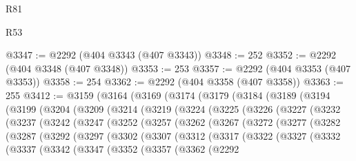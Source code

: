 \begin{lexlean}{R81}
\begin{lexlean}{R53}
\begin{coremodule}
{{{{{{{{{{{{{{{{{{{{{{{{{{{{{{{{{{{{{{{{{{{{{{{{{{{{{{{{{{{{{{{{{{{{{{{{{{{{{{{{{{{{{{{{{{{{{{{{{{{{{{{{{{{{{{{{@3347 := @2292 (@404 @3343 (@407 @3343))
@3348 := 252
@3352 := @2292 (@404 @3348 (@407 @3348))
@3353 := 253
@3357 := @2292 (@404 @3353 (@407 @3353))
@3358 := 254
@3362 := @2292 (@404 @3358 (@407 @3358))
@3363 := 255
@3412 := @3159
    (@3164
      (@3169
        (@3174
          (@3179
            (@3184
              (@3189
                (@3194
                  (@3199
                    (@3204
                      (@3209
                        (@3214
                          (@3219
                            (@3224
                              (@3225
                                (@3226
                                  (@3227
                                    (@3232
                                      (@3237
                                        (@3242
                                          (@3247
                                            (@3252
                                              (@3257
                                                (@3262
                                                  (@3267
                                                    (@3272
                                                      (@3277
                                                        (@3282
                                                          (@3287
                                                            (@3292
                                                              (@3297
                                                                (@3302
                                                                  (@3307
                                                                    (@3312
                                                                      (@3317
                                                                        (@3322
                                                                          (@3327
                                                                            (@3332
                                                                              (@3337
                                                                                (@3342
                                                                                  (@3347
                                                                                    (@3352
                                                                                      (@3357
                                                                                        (@3362
                                                                                          (@2292
}}}}}}}}}}}}}}}}}}}}}}}}}}}}}}}}}}}}}}}}}}}}}}}}}}}}}}}}}}}}}}}}}}}}}}}}}}}}}}}}}}}}}}}}}}}}}}}}}}}}}}}}}}}}}}}}
\end{coremodule}
\end{lexlean}
\end{lexlean}
